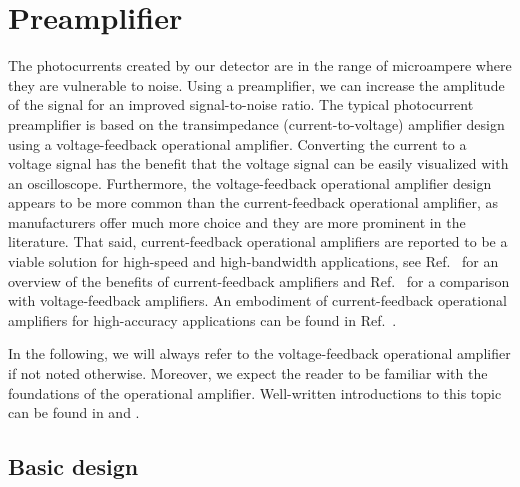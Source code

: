 \section{Preamplifier}

The photocurrents created by our detector are in the range of microampere where they are vulnerable to noise.
Using a preamplifier, we can increase the amplitude of the signal for an improved signal-to-noise ratio.
The typical photocurrent preamplifier is based on the transimpedance (current-to-voltage) amplifier design using a voltage-feedback operational amplifier.
Converting the current to a voltage signal has the benefit that the voltage signal can be easily visualized with an oscilloscope.
Furthermore, the voltage-feedback operational amplifier design appears to be more common than the current-feedback operational amplifier, as manufacturers offer much more choice and they are more prominent in the literature.
That said, current-feedback operational amplifiers are reported to be a viable solution for high-speed and high-bandwidth applications, see Ref.~\cite[p.~110]{Jung05} for an overview of the benefits of current-feedback amplifiers and Ref.~\cite[Ch.~9]{Carter17} for a comparison with voltage-feedback amplifiers.
An embodiment of current-feedback operational amplifiers for high-accuracy applications can be found in Ref.~\cite[p.~143]{Noorlag74}.

In the following, we will always refer to the voltage-feedback operational amplifier if not noted otherwise.
Moreover, we expect the reader to be familiar with the foundations of the operational amplifier.
Well-written introductions to this topic can be found in \cite[Ch.~1]{Jung05} and \cite[Ch.~3]{Carter17}.

\subsection{Basic design}

